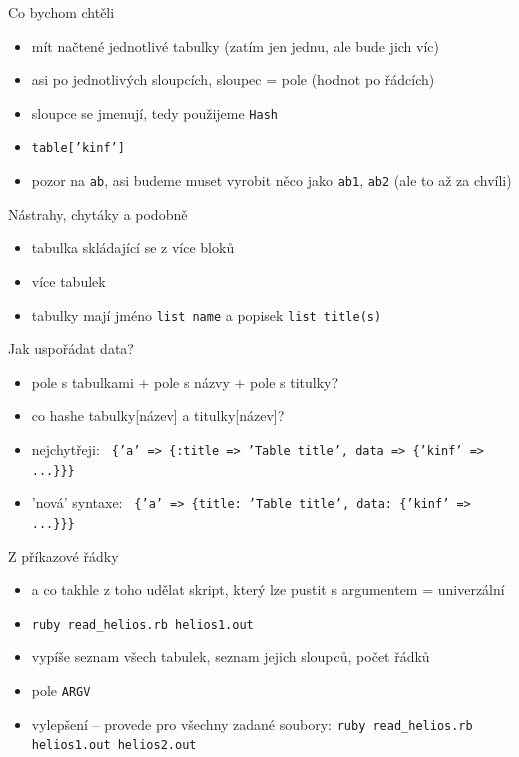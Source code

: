 \documentclass{beamer}
\begin{document}
\begin{frame}{Co bychom chtěli}
  \begin{itemize}
    \item mít načtené jednotlivé tabulky (zatím jen jednu, ale bude jich víc)
    \item asi po jednotlivých sloupcích, sloupec = pole (hodnot po řádcích)
    \item sloupce se jmenují, tedy použijeme \texttt{Hash}
    \item \texttt{table['kinf']}
    \item pozor na \texttt{ab}, asi budeme muset vyrobit něco jako \texttt{ab1}, \texttt{ab2} (ale to až za chvíli)
  \end{itemize}
\end{frame}

\begin{frame}{Nástrahy, chytáky a podobně}
  \begin{itemize}
    \item tabulka skládající se z více bloků
    \item více tabulek
    \item tabulky mají jméno \texttt{list name} a popisek \texttt{list title(s)}
  \end{itemize}
\end{frame}

\begin{frame}{Jak uspořádat data?}
  \begin{itemize}
    \item pole s tabulkami + pole s názvy + pole s titulky?
    \pause
    \item co hashe tabulky[název] a titulky[název]?
    \pause
    \item nejchytřeji: \texttt{ \{'a' => \{:title => 'Table title', data => \{'kinf' => ...\}\}\} }
    \pause
    \item 'nová' syntaxe: \texttt{ \{'a' => \{title: 'Table title', data: \{'kinf' => ...\}\}\} }
  \end{itemize}
\end{frame}

\begin{frame}{Z příkazové řádky}
  \begin{itemize}
    \item a co takhle z toho udělat skript, který lze pustit s argumentem = univerzální
    \item \texttt{ruby read\_helios.rb helios1.out}
    \item vypíše seznam všech tabulek, seznam jejich sloupců, počet řádků
    \item pole \texttt{ARGV} 
    \item vylepšení – provede pro všechny zadané soubory: \texttt{ruby read\_helios.rb helios1.out helios2.out}
  \end{itemize}
\end{frame}
\end{document}
